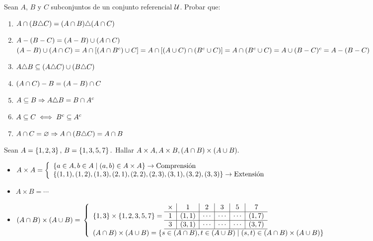 \ejercicio Sean $A$, $B$ y $C$ subconjuntos de un conjunto referencial $\universo$. Probar que:
\begin{enumerate}[label=\roman*)]
	\item $A \inter (B \triangle C) = (A \inter B) \triangle (A \inter C)$

	\item $A - (B - C) = (A-B) \union (A \inter C)$\\
	      $(A - B) \union (A \inter C) = A \inter [(A \inter B^c) \union C] = A \inter [(A \union C) \inter (B^c \union C)] =\\
		      A \inter (B^c \union C) = A \union(B-C)^c = A - (B - C)$

	\item $A \triangle B \subseteq (A \triangle C) \union (B \triangle C)$ \Hacer
	\item $(A \inter C ) - B = (A - B) \inter C$
	\item $A \subseteq B \entonces A \triangle B = B \inter A^c$
	\item $A \subseteq C \sisolosi B^c \subseteq A^c$
	\item $A \inter C = \vacio \entonces A \inter (B \triangle C) = A \inter B$
\end{enumerate}


\ejercicio Sean $A = \set{1, 2, 3},\, B = \set{1, 3, 5, 7}.$ Hallar $A \times A, A \times B, (A \inter B) \times (A \union B).$

\begin{itemize}
	\item $A \times A =
		      \llave{l}{
			      \set{a \en A, b \en A \talque (a, b) \en A \times A} \to \text{Comprensión}\\
			      \set{(1,1), (1,2), (1,3),(2,1),(2,2), (2,3), (3,1), (3,2), (3,3)} \to \text{Extensión}
		      }$

	\item  $A \times B = \cdots$

	\item $(A \inter B) \times (A \union B) = \\
		      \llave{l}{
			      \set{1, 3} \times \set{1,2,3,5,7} =
			      \begin{array}{c|c|c|c|c|c}
				      \times & 1     & 2      & 3      & 5      & 7     \\
				      \hline
				      1      & (1,1) & \cdots & \cdots & \cdots & (1,7) \\
				      \hline
				      3      & (3,1) & \cdots & \cdots & \cdots & (3,7) \\
				      \hline
			      \end{array}\\

			      (A \inter B) \times (A \union B) = \set{s \en (A \inter B), t \en (A \union B) \talque (s, t) \en (A \inter B) \times (A \union B)}
		      }$
\end{itemize}

